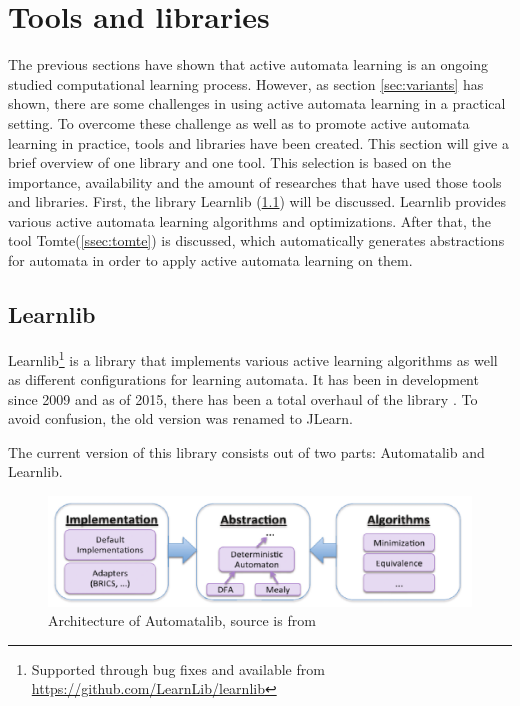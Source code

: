 \documentclass[multi,crop=false,class=article]{standalone}
\begin{document}
\section{Tools and libraries}
\label{sec:tools}
The previous sections have shown that active automata learning is an ongoing  
studied computational learning process. However, as section \ref{sec:variants} 
has shown, there are some challenges in using active automata learning in a 
practical setting. To overcome these challenge as well as to promote active 
automata learning in practice, tools and libraries have been created. This 
section will give a brief overview of one library and one tool. This selection 
is based on the importance, availability and the amount of researches that have 
used those tools and libraries. First, the library Learnlib 
(\ref{ssec:learnlib}) will be discussed. Learnlib provides various active 
automata learning algorithms and optimizations. After that, the tool 
Tomte(\ref{ssec:tomte}) is discussed, which automatically generates 
abstractions for automata in order to apply active automata learning on them. 

\subsection{Learnlib}
\label{ssec:learnlib}

Learnlib\footnote{Supported through bug fixes and available from
\url{https://github.com/LearnLib/learnlib}} is a library that implements various
active learning algorithms as well as different configurations for learning
automata. It has been in development since 2009 \cite{Raffelt2009} and as of
2015, there has been a total overhaul of the library \cite{Isberner2015b}. To 
avoid confusion, the old version was renamed to JLearn.

The current version of this library consists out of two parts: Automatalib and
Learnlib.

\begin{figure}[!ht]
	\includegraphics[width=\textwidth]{Tool_images/automatalib_architecture.png}
	\caption{Architecture of Automatalib, source is from \cite{Isberner2015b}}
	\label{fig:automatalib_arch}
\end{figure}
\end{document}
